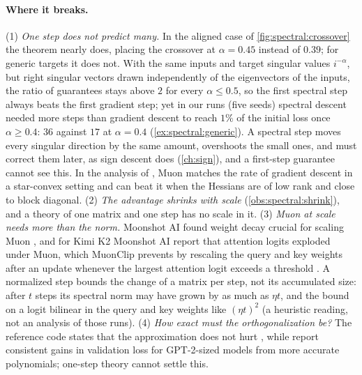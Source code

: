 \begin{refsection}
\paragraph{Where it breaks.} (1) \emph{One step does not predict many.} In the aligned case of \cref{fig:spectral:crossover} the theorem nearly does, placing the crossover at $\alpha=0.45$ instead of $0.39$; for generic targets it does not. With the same inputs and target singular values $i^{-\alpha}$, but right singular vectors drawn independently of the eigenvectors of the inputs, the ratio of guarantees stays above $2$ for every $\alpha\le0.5$, so the first spectral step always beats the first gradient step; yet in our runs (five seeds) spectral descent needed more steps than gradient descent to reach $1\%$ of the initial loss once $\alpha\ge0.4$: $36$ against $17$ at $\alpha=0.4$ (\cref{ex:spectral:generic}). A spectral step moves every singular direction by the same amount, overshoots the small ones, and must correct them later, as sign descent does (\cref{ch:sign}), and a first-step guarantee cannot see this. In the analysis of \textcite{ShenEtAl2025}, Muon matches the rate of gradient descent in a star-convex setting and can beat it when the Hessians are of low rank and close to block diagonal. (2) \emph{The advantage shrinks with scale} (\cref{obs:spectral:shrink}), and a theory of one matrix and one step has no scale in it. (3) \emph{Muon at scale needs more than the norm.} Moonshot AI found weight decay crucial for scaling Muon \parencite{LiuEtAl2025Muon}, and for Kimi K2 Moonshot AI report that attention logits exploded under Muon, which MuonClip prevents by rescaling the query and key weights after an update whenever the largest attention logit exceeds a threshold \parencite{KimiTeam2025}. A normalized step bounds the change of a matrix per step, not its accumulated size: after $t$ steps its spectral norm may have grown by as much as $\eta t$, and the bound on a logit bilinear in the query and key weights like $(\eta t)^2$ (a heuristic reading, not an analysis of those runs). (4) \emph{How exact must the orthogonalization be?} The reference code states that the approximation does not hurt \parencite{Jordan2024}, while \textcite{AmselEtAl2026} report consistent gains in validation loss for GPT-2-sized models from more accurate polynomials; one-step theory cannot settle this.


\end{refsection}
